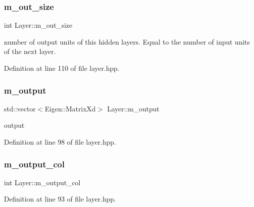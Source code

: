 \mbox{\label{class_layer_a20c7215be5d6769fb04c19dba7e1bb6e}} 
\subsubsection{\texorpdfstring{m\+\_\+out\+\_\+size}{m\_out\_size}}
{\footnotesize\ttfamily int Layer\+::m\+\_\+out\+\_\+size\hspace{0.3cm}{\ttfamily [protected]}}



number of output units of this hidden layers. Equal to the number of input units of the next layer. 



Definition at line 110 of file layer.\+hpp.

\mbox{\label{class_layer_a2e934750797431c52b7a8bfc36ff5be3}} 
\subsubsection{\texorpdfstring{m\+\_\+output}{m\_output}}
{\footnotesize\ttfamily std\+::vector$<$Eigen\+::\+Matrix\+Xd$>$ Layer\+::m\+\_\+output\hspace{0.3cm}{\ttfamily [protected]}}



output 



Definition at line 98 of file layer.\+hpp.

\mbox{\label{class_layer_abc7bb3c63481c35c0f1b1e3e9cdea98d}} 
\subsubsection{\texorpdfstring{m\+\_\+output\+\_\+col}{m\_output\_col}}
{\footnotesize\ttfamily int Layer\+::m\+\_\+output\+\_\+col\hspace{0.3cm}{\ttfamily [protected]}}



Definition at line 93 of file layer.\+hpp.

